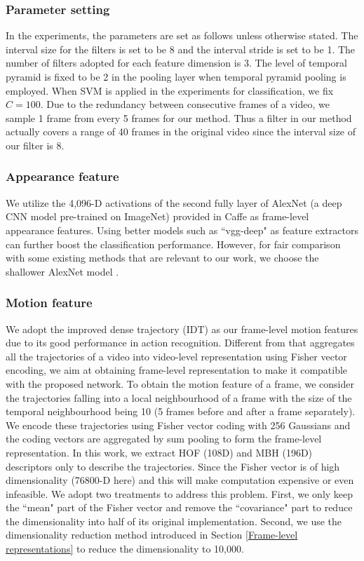 \documentclass[journal]{IEEEtran}
\begin{document}
\subsubsection{Parameter setting}
In the experiments, the parameters are set as follows unless otherwise stated. The interval size for the filters is set to be 8 and the interval stride is set to be 1. The number of filters adopted for each feature dimension is 3. The level of temporal pyramid is fixed to be 2 in the pooling layer when temporal pyramid pooling is employed. When SVM is applied in the experiments for classification, we fix $C=100$. Due to the redundancy between consecutive frames of a video, we sample 1 frame from every 5 frames for our method. Thus a filter in our method actually covers a range of 40 frames in the original video since the interval size of our filter is 8.


\subsubsection{Appearance feature} We utilize the 4,096-D activations of the second fully layer of AlexNet \cite{NIPS2012_4824} (a deep CNN model pre-trained on ImageNet) provided in Caffe \cite{jia2014caffe} as frame-level appearance features. Using better models such as ``vgg-deep" \cite{Simonyan15} as feature extractors can further boost the classification performance. However, for fair comparison with some existing methods \cite{Andrew14, KarpathyCVPR14} that are relevant to our work, we choose the shallower AlexNet model \cite{NIPS2012_4824}.

\subsubsection{Motion feature} We adopt the improved dense trajectory (IDT) \cite{Wang2013} as our frame-level motion features due to its good performance in action recognition. Different from \cite{Wang2013} that aggregates all the trajectories of a video into video-level representation using Fisher vector encoding, we aim at obtaining frame-level representation to make it compatible with the proposed network. To obtain the motion feature of a frame,
we consider the trajectories falling into a local neighbourhood of a frame with the size of the temporal neighbourhood being 10 (5 frames before and after a frame separately).
We encode these trajectories using Fisher vector coding with 256 Gaussians and the coding vectors are aggregated by sum pooling to form the frame-level representation. In this work, we extract HOF (108D) and MBH (196D) descriptors only to describe the trajectories. Since the Fisher vector is of high dimensionality (76800-D here) and this will make computation expensive or even infeasible. We adopt two treatments to address this problem. First, we only keep the ``mean" part of the Fisher vector and remove the ``covariance" part to reduce the dimensionality into half of its original implementation. Second, we use the dimensionality reduction method introduced in Section \ref{Frame-level representations} to reduce the dimensionality to 10,000.
\end{document}

